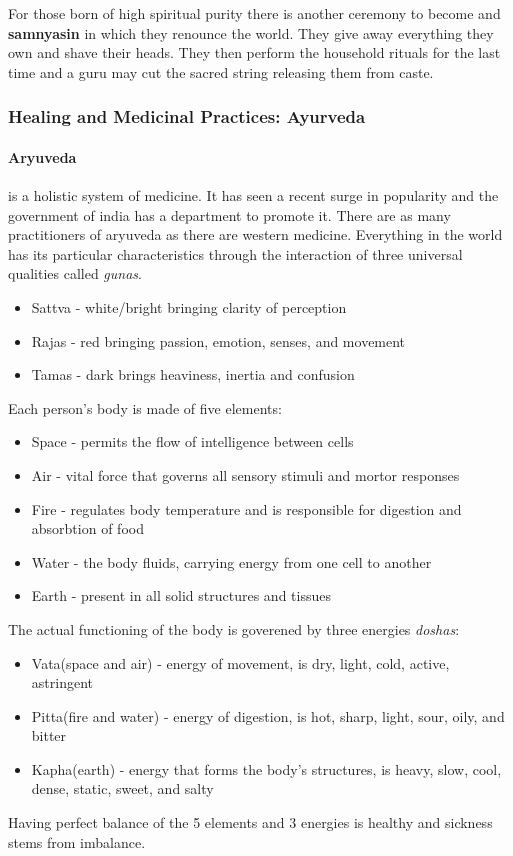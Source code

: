 \documentclass{article}
\begin{document}
For those born of high spiritual purity there is another ceremony to become and \textbf{samnyasin} in which they renounce the world. They give away everything they own and shave their heads. They then perform the household rituals for the last time and a guru may cut the sacred string releasing them from caste.

\subsubsection{Healing and Medicinal Practices: Ayurveda}
\label{ssub:healing_and_medicinal_practices_ayurveda}
\paragraph{Aryuveda}
\label{par:aryuveda}
is a holistic system of medicine. It has seen a recent surge in popularity and the government of india has a department to promote it. There are as many practitioners of aryuveda as there are western medicine. Everything in the world has its particular characteristics through the interaction of three universal qualities called \emph{gunas}.
\begin{itemize}
	\item Sattva - white/bright bringing clarity of perception
	\item Rajas - red bringing passion, emotion, senses, and movement
	\item Tamas - dark brings heaviness, inertia and confusion
\end{itemize}
Each person's body is made of five elements:
\begin{itemize}
	\item Space - permits the flow of intelligence between cells
	\item Air - vital force that governs all sensory stimuli and mortor responses
	\item Fire - regulates body temperature and is responsible for digestion and absorbtion of food
	\item Water - the body fluids, carrying energy from one cell to another
	\item Earth - present in all solid structures and tissues
\end{itemize}
The actual functioning of the body is goverened by three energies \emph{doshas}:
\begin{itemize}
	\item Vata(space and air) - energy of movement, is dry, light, cold, active, astringent
	\item Pitta(fire and water) - energy of digestion, is hot, sharp, light, sour, oily, and bitter
	\item Kapha(earth) - energy that forms the body's structures, is heavy, slow, cool, dense, static, sweet, and salty
\end{itemize}
Having perfect balance of the 5 elements and 3 energies is healthy and sickness stems from imbalance.
\end{document}
